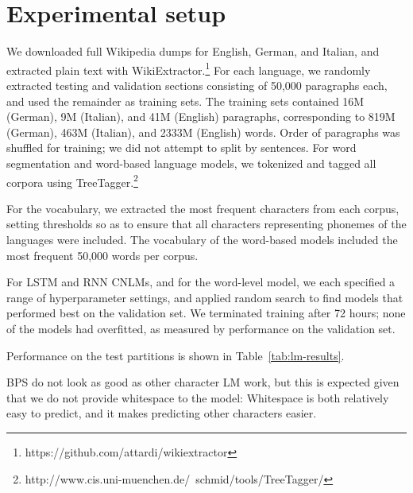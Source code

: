 \section{Experimental setup}
\label{sec:setup}

We downloaded full Wikipedia dumps for English, German, and Italian, and extracted plain text with WikiExtractor.\footnote{https://github.com/attardi/wikiextractor}
For each language, we randomly extracted testing and validation sections consisting of 50,000 paragraphs each, and used the remainder as training sets.
The training sets contained 16M (German), 9M (Italian), and 41M (English) paragraphs, corresponding to 819M (German), 463M (Italian), and 2333M (English) words.
Order of paragraphs was shuffled for training; we did not attempt to split by sentences.
For word segmentation and word-based language models, we tokenized and tagged all corpora using TreeTagger.\footnote{http://www.cis.uni-muenchen.de/~schmid/tools/TreeTagger/}

For the vocabulary, we extracted the most frequent characters from each corpus, setting thresholds so as to ensure that all characters representing phonemes of the languages were included.
The vocabulary of the word-based models included the most frequent 50,000 words per corpus.


For LSTM and RNN CNLMs, and for the word-level model, we each specified a range of hyperparameter settings, and applied random search to find models that performed best on the validation set.
We terminated training after 72 hours; none of the models had overfitted, as measured by performance on the validation set.

Performance on the test partitions is shown in Table~\ref{tab:lm-results}.

BPS do not look as good as other character LM work, but this is expected given that we do not provide whitespace to the model: Whitespace is both relatively easy to predict, and it makes predicting other characters easier.




